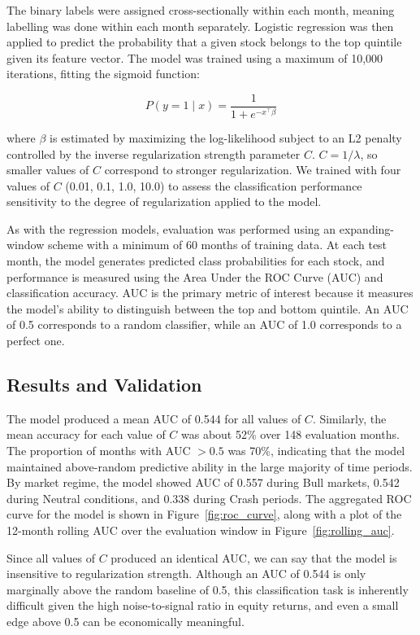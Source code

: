 \documentclass[11pt]{article}
\begin{document}
The binary labels were assigned cross-sectionally within each month, meaning labelling was done within each month separately. Logistic regression was then applied to predict the probability that a given stock belongs to the top quintile given its feature vector. The model was trained using a maximum of 10{,}000 iterations, fitting the sigmoid function:

\begin{equation}
    P(y = 1 \mid x) = \frac{1}{1 + e^{-x^{\intercal}\beta}}
\end{equation}

where $\beta$ is estimated by maximizing the log-likelihood subject to an L2 penalty controlled by the inverse regularization strength parameter $C$. $C = 1/\lambda$, so smaller values of $C$ correspond to stronger regularization. We trained with four values of $C$ (0.01, 0.1, 1.0, 10.0) to assess the classification performance sensitivity to the degree of regularization applied to the model.

As with the regression models, evaluation was performed using an expanding-window scheme with a minimum of 60 months of training data. At each test month, the model generates predicted class probabilities for each stock, and performance is measured using the Area Under the ROC Curve (AUC) and classification accuracy. AUC is the primary metric of interest because it measures the model's ability to distinguish between the top and bottom quintile. An AUC of 0.5 corresponds to a random classifier, while an AUC of 1.0 corresponds to a perfect one.

\subsection{Results and Validation}

The model produced a mean AUC of 0.544 for all values of $C$. Similarly, the mean accuracy for each value of $C$ was about 52\% over 148 evaluation months. The proportion of months with AUC $> 0.5$ was 70\%, indicating that the model maintained above-random predictive ability in the large majority of time periods. By market regime, the model showed AUC of 0.557 during Bull markets, 0.542 during Neutral conditions, and 0.338 during Crash periods. The aggregated ROC curve for the model is shown in Figure~\ref{fig:roc_curve}, along with a plot of the 12-month rolling AUC over the evaluation window in Figure~\ref{fig:rolling_auc}.

Since all values of $C$ produced an identical AUC, we can say that the model is insensitive to regularization strength. Although an AUC of 0.544 is only marginally above the random baseline of 0.5, this classification task is inherently difficult given the high noise-to-signal ratio in equity returns, and even a small edge above 0.5 can be economically meaningful.
\end{document}
